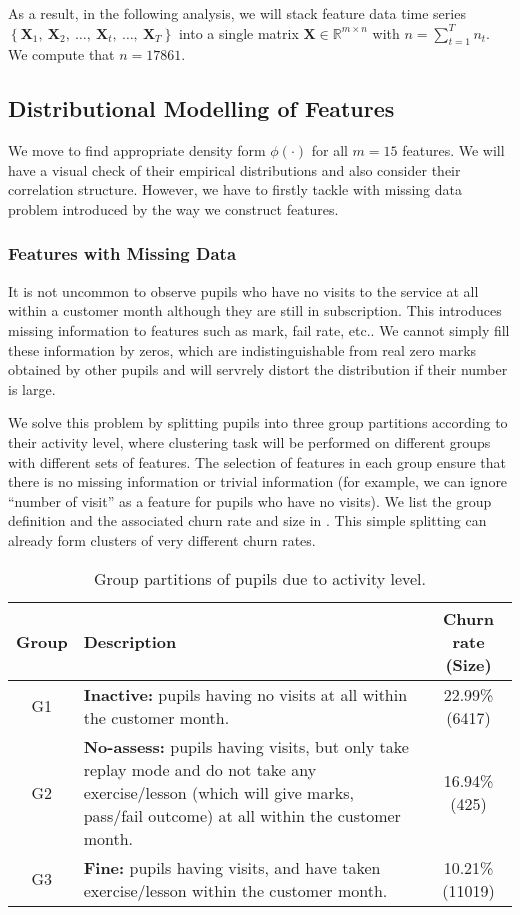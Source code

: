 As a result, in the following analysis, we will stack feature data time series $\left\lbrace \mathbf{X}_1, ~\mathbf{X}_2, ~\dots, ~\mathbf{X}_t, ~\dots, ~\mathbf{X}_T \right\rbrace$ into a single matrix $\mathbf{X} \in \mathbb{R}^{m \times n}$ with $n = \sum_{t=1}^{T} n_t$. We compute that $n=17861$.

\subsection{Distributional Modelling of Features}

We move to find appropriate density form $\phi(\cdot)$ for all $m=15$ features. We will have a visual check of their empirical distributions and also consider their correlation structure. However, we have to firstly tackle with missing data problem introduced by the way we construct features.

\subsubsection{Features with Missing Data}

It is not uncommon to observe pupils who have no visits to the service at all within a customer month although they are still in subscription. This introduces missing information to features such as mark, fail rate, etc.. We cannot simply fill these information by zeros, which are indistinguishable from real zero marks obtained by other pupils and will servrely distort the distribution if their number is large. 

We solve this problem by splitting pupils into three group partitions according to their activity level, where clustering task will be performed on different groups with different sets of features. The selection of features in each group ensure that there is no missing information or trivial information (for example, we can ignore ``number of visit'' as a feature for pupils who have no visits). We list the group definition and the associated churn rate and size in . This simple splitting can already form clusters of very different churn rates. 

\begin{table}[!h]
\centering
\footnotesize
\begin{tabular}{c|p{9cm}|c}
\hline
\textbf{Group} & \textbf{Description} & \textbf{Churn rate (Size)}\\
\hline
G1 &
\textbf{Inactive:} pupils having no visits at all within the customer month. &
22.99\% (6417) \\
\hline
G2 &
\textbf{No-assess:} pupils having visits, but only take replay mode and do not take any exercise/lesson (which will give marks, pass/fail outcome) at all within the customer month. &
16.94\% (425) \\
\hline
G3 &
\textbf{Fine:} pupils having visits, and have taken exercise/lesson within the customer month. &
10.21\% (11019) \\
\hline
\end{tabular}
\caption{Group partitions of pupils due to activity level.}
\label{tab:G123}
\end{table}

